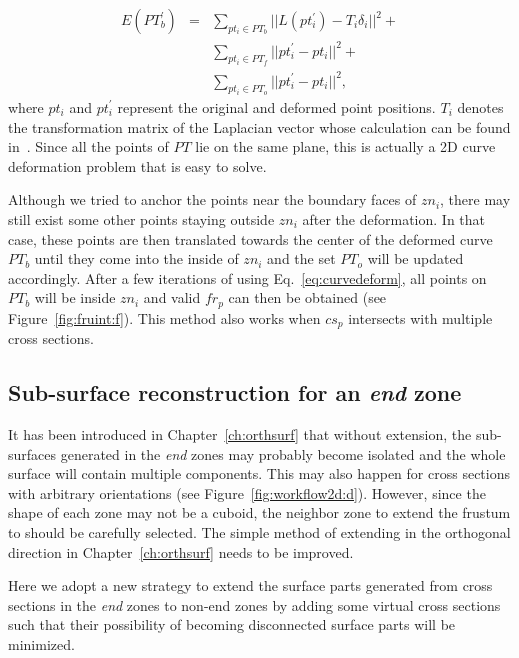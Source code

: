 \begin{eqnarray}
\label{eq:curvedeform}
E(PT_b^\prime) &=& \sum\limits_{pt_i \in PT_b} {||L(pt_i^\prime)- T_i\delta_i||^2}+\nonumber\\
& & \sum\limits_{pt_i \in PT_f}{||pt_i^\prime-pt_i||^2}+\nonumber\\
& & \sum\limits_{pt_i \in PT_o}{||pt_i^\prime-pt_i||^2},
\end{eqnarray}
where $pt_i$ and $pt_i^\prime$ represent the original and deformed point positions. $T_i$ denotes the transformation matrix of the Laplacian vector whose calculation can be found in~\cite{ESA07}. Since all the points of $PT$ lie on the same plane, this is actually a 2D curve deformation problem that is easy to solve.

Although we tried to  anchor the points near the boundary faces of
$zn_i$, there may still exist some other points staying outside
$zn_i$ after the deformation. In that case, these points are then
translated towards the center of the deformed curve $PT_b$ until
they come into the inside of $zn_i$ and the set $PT_o$ will be
updated accordingly. After a few iterations of using
Eq.~\ref{eq:curvedeform}, all points on $PT_b$ will be inside $zn_i$
and valid $fr_p$ can then be obtained (see
Figure~\ref{fig:fruint:f}). This method also works when $cs_p$
intersects with multiple cross sections.



\subsection{Sub-surface reconstruction for an \textit{end} zone}
\label{ch6:sec:reconst:end}

It has been  introduced in Chapter~\ref{ch:orthsurf} that without
extension, the sub-surfaces generated in the \textit{end} zones may
probably become isolated and the whole surface will contain multiple
components. This may also happen for cross sections with arbitrary
orientations (see Figure~\ref{fig:workflow2d:d}). However, since the
shape of each zone may not be a cuboid,  the neighbor zone to extend
the frustum to should be carefully selected. The simple method of
extending in the orthogonal direction in Chapter~\ref{ch:orthsurf}
needs to be improved.

Here we adopt a new strategy to extend  the surface parts generated
from cross sections in the \textit{end} zones to non-end zones by
adding some virtual cross sections such that their possibility of
becoming disconnected surface parts will be minimized.


